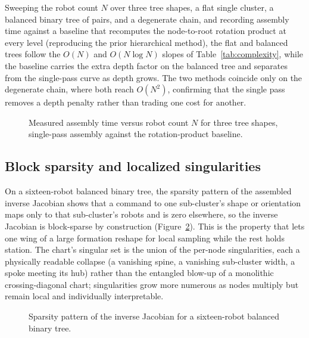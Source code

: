 \documentclass[12pt, letterpaper, oneside]{report}
\begin{document}
Sweeping the robot count $N$ over three tree shapes, a flat single cluster,
a balanced binary tree of pairs, and a degenerate chain, and recording
assembly time against a baseline that recomputes the node-to-root rotation
product at every level (reproducing the prior hierarchical method), the
flat and balanced trees follow the $O(N)$ and $O(N\log N)$ slopes of
Table~\ref{tab:complexity}, while the baseline carries the extra depth
factor on the balanced tree and separates from the single-pass curve as
depth grows. The two methods coincide only on the degenerate chain, where
both reach $O(N^2)$, confirming that the single pass removes a depth
penalty rather than trading one cost for another.

\begin{figure}[t]
\centering
\framebox[0.9\linewidth]{\rule{0pt}{3.0cm}}
\caption{Measured assembly time versus robot count $N$ for three tree
shapes, single-pass assembly against the rotation-product baseline.}
\label{fig:scaling}
\end{figure}

\subsection{Block sparsity and localized singularities}

On a sixteen-robot balanced binary tree, the sparsity pattern of the
assembled inverse Jacobian shows that a command to one sub-cluster's shape
or orientation maps only to that sub-cluster's robots and is zero
elsewhere, so the inverse Jacobian is block-sparse by construction
(Figure~\ref{fig:sparsity}). This is the property that lets one wing of a
large formation reshape for local sampling while the rest holds station.
The chart's singular set is the union of the per-node singularities, each a
physically readable collapse (a vanishing spine, a vanishing sub-cluster
width, a spoke meeting its hub) rather than the entangled blow-up of a
monolithic crossing-diagonal chart; singularities grow more numerous as
nodes multiply but remain local and individually interpretable.

\begin{figure}[t]
\centering
\framebox[0.9\linewidth]{\rule{0pt}{3.0cm}}
\caption{Sparsity pattern of the inverse Jacobian for a sixteen-robot
balanced binary tree.}
\label{fig:sparsity}
\end{figure}
\end{document}
